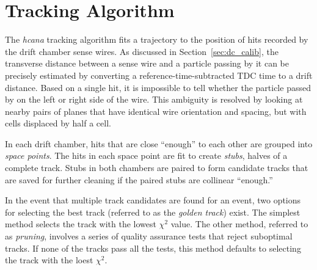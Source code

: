 \section{Tracking Algorithm}
The \textit{hcana} tracking algorithm fits a trajectory to the position of hits
recorded by the drift chamber sense wires.
As discussed in Section~\ref{sec:dc_calib}, the transverse distance between a
sense wire and a particle passing by it can be precisely estimated by
converting a reference-time-subtracted TDC time to a drift distance.
Based on a single hit, it is impossible to tell whether the particle passed by
on the left or right side of the wire.
This ambiguity is resolved by looking at nearby pairs of planes that have
identical wire orientation and spacing, but with cells displaced by half a
cell.


In each drift chamber, hits that are close ``enough'' to each other are grouped
into \textit{space points}.
The hits in each space point are fit to create \textit{stubs}, halves of a
complete track.
Stubs in both chambers are paired to form candidate tracks that are saved for
further cleaning if the paired stubs are collinear ``enough.''


In the event that multiple track candidates are found for an event, two options
for selecting the best track (referred to as the \textit{golden track}) exist.
The simplest method selects the track with the lowest $\chi^2$ value.
The other method, referred to as \textit{pruning}, involves a series of quality
assurance tests that reject suboptimal tracks.
If none of the tracks pass all the tests, this method defaults to selecting the
track with the loest $\chi^2$.
